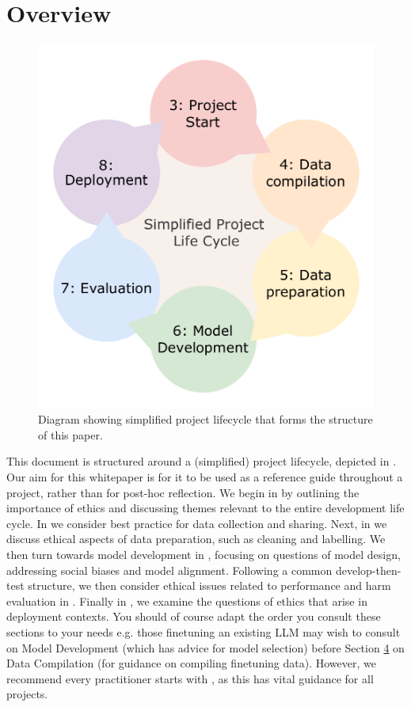 \section{Overview}
\begin{figure}
    \centering
    \includegraphics[scale=0.4]{whitepaperstructure.pdf}
    \caption{Diagram showing simplified project lifecycle that forms the structure of this paper.}
    \label{fig:paperstructure}
\end{figure}
This document is structured around a (simplified) project lifecycle, depicted in . Our aim for this whitepaper is for it to be used as a reference guide throughout a project, rather than for post-hoc reflection. We begin in  by outlining the importance of ethics and discussing themes relevant to the entire development life cycle.
In  we consider best practice for data collection and sharing.
Next, in  we discuss ethical aspects of data preparation, such as cleaning and labelling.
We then turn towards model development in , focusing on questions of model design, addressing social biases and model alignment.
Following a common develop-then-test structure, we then consider ethical issues related to performance and harm evaluation in .
Finally in , we examine the questions of ethics that arise in deployment contexts. You should of course adapt the order you consult these sections to your needs e.g. those finetuning an existing LLM may wish to consult  on Model Development (which has advice for model selection) before Section \hyperref[sec:comp]{4} on Data Compilation (for guidance on compiling finetuning data). However, we recommend every practitioner starts with , as this has vital guidance for all projects. 

